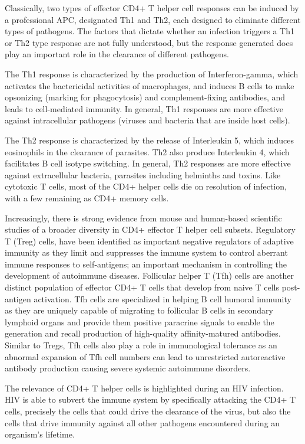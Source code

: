 Classically, two types of effector CD4+ T helper cell responses can be induced by a professional APC, designated Th1 and Th2, each designed to eliminate different types of pathogens. The factors that dictate whether an infection triggers a Th1 or Th2 type response are not fully understood, but the response generated does play an important role in the clearance of different pathogens.

The Th1 response is characterized by the production of Interferon-gamma, which activates the bactericidal activities of macrophages, and induces B cells to make opsonizing (marking for phagocytosis) and complement-fixing antibodies, and leads to cell-mediated immunity. In general, Th1 responses are more effective against intracellular pathogens (viruses and bacteria that are inside host cells).

The Th2 response is characterized by the release of Interleukin 5, which induces eosinophils in the clearance of parasites. Th2 also produce Interleukin 4, which facilitates B cell isotype switching. In general, Th2 responses are more effective against extracellular bacteria, parasites including helminths and toxins. Like cytotoxic T cells, most of the CD4+ helper cells die on resolution of infection, with a few remaining as CD4+ memory cells.

Increasingly, there is strong evidence from mouse and human-based scientific studies of a broader diversity in CD4+ effector T helper cell subsets. Regulatory T (Treg) cells, have been identified as important negative regulators of adaptive immunity as they limit and suppresses the immune system to control aberrant immune responses to self-antigens; an important mechanism in controlling the development of autoimmune diseases. Follicular helper T (Tfh) cells are another distinct population of effector CD4+ T cells that develop from naive T cells post-antigen activation. Tfh cells are specialized in helping B cell humoral immunity as they are uniquely capable of migrating to follicular B cells in secondary lymphoid organs and provide them positive paracrine signals to enable the generation and recall production of high-quality affinity-matured antibodies. Similar to Tregs, Tfh cells also play a role in immunological tolerance as an abnormal expansion of Tfh cell numbers can lead to unrestricted autoreactive antibody production causing severe systemic autoimmune disorders.

The relevance of CD4+ T helper cells is highlighted during an HIV infection. HIV is able to subvert the immune system by specifically attacking the CD4+ T cells, precisely the cells that could drive the clearance of the virus, but also the cells that drive immunity against all other pathogens encountered during an organism's lifetime.

